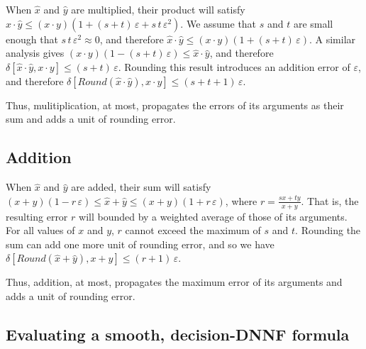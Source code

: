 \documentclass[letterpaper,USenglish,cleveref, autoref, thm-restate]{lipics-v2021}
\newcommand{\approximate}[1]{\hat{#1}}
\newcommand{\approxx}{\approximate{x}}
\newcommand{\approxy}{\approximate{y}}
\newcommand{\round}{\mathit{Round}}
\newcommand{\aerror}{\delta}
\newcommand{\roundepsilon}{\varepsilon}
\begin{document}
When $\approxx$ and $\approxy$ are multiplied, their product will satisfy
$\approxx \cdot \approxy \leq (x\cdot y) (1 + (s+t)\,\roundepsilon + s\,t\,\roundepsilon^2)$.
We assume that $s$ and $t$ are small enough that $s\, t\,\roundepsilon^2 \approx 0$, and therefore
$\approxx \cdot \approxy \leq (x\cdot y) (1 + (s+t)\,\roundepsilon)$.  A similar analysis gives
$(x\cdot y) (1 - (s+t)\,\roundepsilon) \leq \approxx \cdot \approxy$, and therefore
$\aerror[\approxx \cdot \approxy, x \cdot y] \leq (s+t)\,\roundepsilon$.
Rounding this result introduces an addition error of $\roundepsilon$, and therefore
$\aerror[\round(\approxx \cdot \approxy), x \cdot y] \leq (s+t+1)\,\roundepsilon$.

Thus, mulitiplication, at most, propagates the errors of its arguments as their sum and adds a unit of rounding error.

\subsection{Addition}

When $\approxx$ and $\approxy$ are added, their sum will satisfy
$(x + y) (1 - r\,\roundepsilon) \leq \approxx + \approxy \leq (x + y) (1 + r\,\roundepsilon)$, where $r = \frac{sx + ty}{x+y}$.  That is, the resulting error $r$ will bounded by a weighted average
of those of its arguments.  For all values of $x$ and $y$, $r$ cannot exceed the maximum of $s$ and $t$.
Rounding the sum can add one more unit of rounding error, and so we have
$\aerror[\round(\approxx + \approxy), x + y] \leq (r+1)\,\roundepsilon$.

Thus, addition, at most,  propagates the maximum error of its arguments and adds a unit of rounding error.

\subsection{Evaluating a smooth, decision-DNNF formula}
\end{document}
